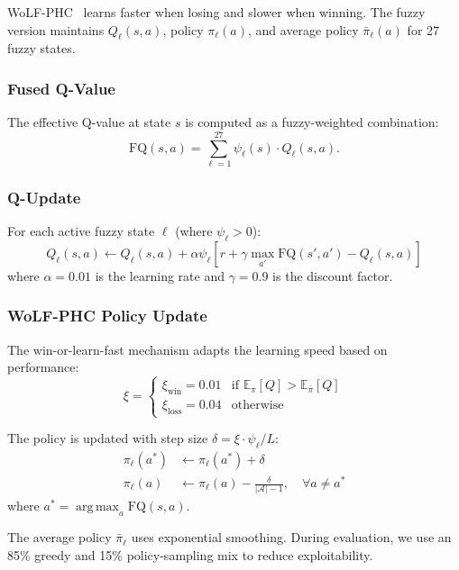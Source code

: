 \documentclass[journal,twocolumn]{IEEEtran}
\newcommand{\E}{\mathbb{E}}
\DeclareMathOperator*{\argmax}{arg\,max}
\begin{document}
WoLF-PHC~\cite{bowling2002wolf} learns faster when losing and slower when winning. The fuzzy version maintains $Q_\ell(s,a)$, policy $\pi_\ell(a)$, and average policy $\bar{\pi}_\ell(a)$ for 27 fuzzy states.

\subsubsection{Fused Q-Value}
The effective Q-value at state $s$ is computed as a fuzzy-weighted combination:
\begin{equation}
\text{FQ}(s, a) = \sum_{\ell=1}^{27}\psi_\ell(s) \cdot Q_\ell(s, a).
\label{eq:fused_q}
\end{equation}

\subsubsection{Q-Update}
For each active fuzzy state $\ell$ (where $\psi_\ell > 0$):
\begin{equation}
Q_\ell(s,a) \leftarrow Q_\ell(s,a) + \alpha\psi_\ell\left[r + \gamma\max_{a'}\text{FQ}(s',a') - Q_\ell(s,a)\right]
\label{eq:q_update}
\end{equation}
where $\alpha = 0.01$ is the learning rate and $\gamma = 0.9$ is the discount factor.

\subsubsection{WoLF-PHC Policy Update}
The win-or-learn-fast mechanism adapts the learning speed based on performance:
\begin{equation}
\xi = \begin{cases}
\xi_{\text{win}} = 0.01 & \text{if } \E_\pi[Q] > \E_{\bar{\pi}}[Q] \\
\xi_{\text{loss}} = 0.04 & \text{otherwise}
\end{cases}
\label{eq:wolf}
\end{equation}

The policy is updated with step size $\delta = \xi \cdot \psi_\ell / L$:
\begin{align}
\pi_\ell(a^*) &\leftarrow \pi_\ell(a^*) + \delta \\
\pi_\ell(a) &\leftarrow \pi_\ell(a) - \frac{\delta}{|\mathcal{A}|-1}, \quad \forall a \neq a^*
\label{eq:policy_update}
\end{align}
where $a^* = \argmax_a \text{FQ}(s,a)$.

The average policy $\bar{\pi}_\ell$ uses exponential smoothing. During evaluation, we use an 85\% greedy and 15\% policy-sampling mix to reduce exploitability.
\end{document}
